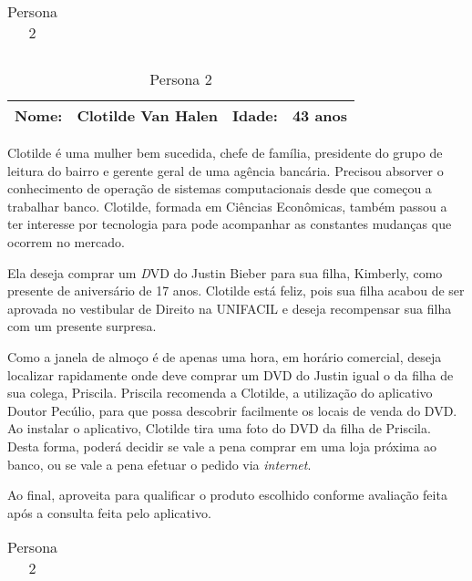 \par \noindent
\begin{table}[ht]
    \begin{tabularx}{\textwidth}{c}
        \toprule
    \end{tabularx}
    
    \begin{tabularx}{\textwidth}{p{}p{}
                                 p{}p{}}
        \textbf{Nome:} & Clotilde Van Halen 
        & \textbf{Idade:} & 43 anos \\
    \midrule
    \end{tabularx}
    
    \hspace*{1cm} Clotilde é uma mulher bem sucedida, chefe de família, 
    presidente do grupo de leitura do bairro e gerente geral de uma 
    agência bancária.  Precisou absorver o conhecimento de operação
    de sistemas computacionais desde que começou a trabalhar banco.
    Clotilde, formada em Ciências Econômicas, também passou a ter interesse 
    por tecnologia para pode acompanhar as constantes mudanças que ocorrem 
    no mercado.

    \hspace*{1cm} Ela deseja comprar um \textit DVD do Justin Bieber para sua filha,
    Kimberly, como presente de aniversário de 17 anos.  Clotilde está
    feliz, pois sua filha acabou de ser aprovada no vestibular de Direito na UNIFACIL
    e deseja recompensar sua filha com um presente surpresa.  
    
    \hspace*{1cm} Como a janela de almoço é de apenas uma hora, em horário comercial, 
    deseja localizar rapidamente onde deve comprar um DVD do Justin igual o da filha de  sua 
    colega, Priscila.  Priscila recomenda a Clotilde, a utilização do aplicativo
    Doutor Pecúlio, para que possa descobrir facilmente os locais de venda
    do DVD.   Ao instalar o aplicativo, Clotilde tira uma foto
    do DVD  da filha de  Priscila.
    Desta forma, poderá decidir se vale a pena comprar em uma loja próxima
    ao banco, ou se vale a pena efetuar o pedido via
    \textit{internet}.

\hspace*{1cm}Ao final, aproveita para qualificar o produto escolhido conforme avaliação feita após a consulta 
feita pelo aplicativo. 
    
    \begin{tabularx}{\textwidth}{c}
        \bottomrule
    \end{tabularx}
    
    \caption{ \label{Persona2} Persona 2}
\end{table}

